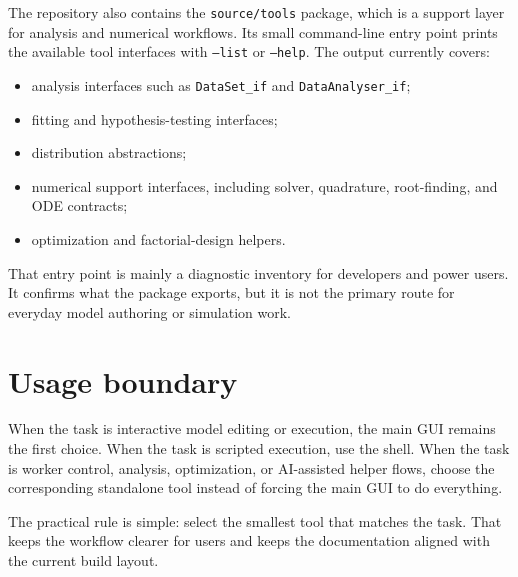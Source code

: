 The repository also contains the \texttt{source/tools} package, which is a
support layer for analysis and numerical workflows. Its small command-line
entry point prints the available tool interfaces with \texttt{--list} or
\texttt{--help}. The output currently covers:

\begin{itemize}
\item analysis interfaces such as \texttt{DataSet\_if} and \texttt{DataAnalyser\_if};
\item fitting and hypothesis-testing interfaces;
\item distribution abstractions;
\item numerical support interfaces, including solver, quadrature, root-finding,
and ODE contracts;
\item optimization and factorial-design helpers.
\end{itemize}

That entry point is mainly a diagnostic inventory for developers and power
users. It confirms what the package exports, but it is not the primary route
for everyday model authoring or simulation work.

\section{Usage boundary}

When the task is interactive model editing or execution, the main GUI remains
the first choice. When the task is scripted execution, use the shell. When the
task is worker control, analysis, optimization, or AI-assisted helper flows,
choose the corresponding standalone tool instead of forcing the main GUI to do
everything.

The practical rule is simple: select the smallest tool that matches the task.
That keeps the workflow clearer for users and keeps the documentation aligned
with the current build layout.
